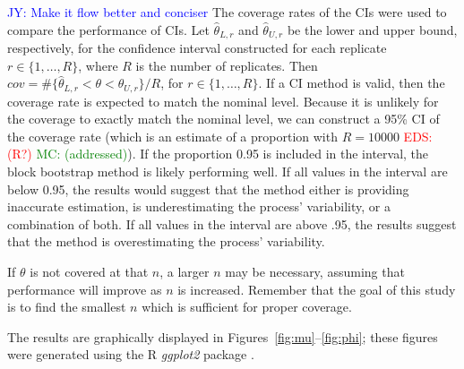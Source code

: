 \documentclass[12pt, letterpaper, titlepage]{article}
\newcommand{\jy}[1]{\textcolor{blue}{JY: #1}}
\newcommand{\eds}[1]{\textcolor{red}{EDS: (#1)}}
\newcommand{\mc}[1]{\textcolor{green}{MC: (#1)}}
\begin{document}
\jy{Make it flow better and conciser}
The coverage rates of the CIs were used to compare the performance of CIs. Let
$\hat\theta_{L, r}$ and $\hat\theta_{U, r}$ be the lower and upper bound,
respectively, for the confidence interval constructed for each replicate
$r \in \{1, \ldots, R\}$, where $R$ is the
number of replicates.
Then $cov = \#\{\hat\theta_{L, r} < \theta < \hat\theta_{U, r} \}/R$,  
for $r \in \{1, \ldots, R\}$.
If a CI method is valid, then the coverage rate is expected to match the
nominal 
level. Because it is unlikely for the coverage to exactly match the nominal
level,
we can construct a 95\% CI of the coverage
rate (which is an estimate of a proportion with $R = 10000$ \eds{R?} \mc{addressed}). If the
proportion
0.95 is included in the interval, the block bootstrap method is likely
performing
well. If all values in the interval are below 0.95, the results would suggest 
that the
method either is providing inaccurate estimation, is underestimating the
process' variability, or a combination of both. If all values in the interval
are above .95, the results suggest that the method is overestimating the
process' variability.

If $\theta$ is not covered at that $n$, a larger $n$ may be
necessary, assuming that performance will improve as $n$ is increased.
Remember that
the goal of this study is to find the smallest $n$ which is sufficient for
proper coverage.

The results are graphically displayed in Figures~\ref{fig:mu}--\ref{fig:phi};
these figures were generated using the R \textsl{ggplot2} package
\citep{ggplot2}.
\end{document}
